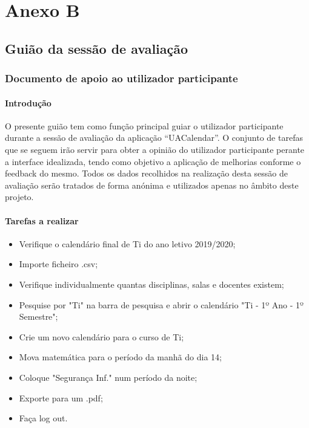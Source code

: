 \documentclass[11pt, twoside]{report}
\begin{document}
	
	\chapter*{Anexo B}
	\section*{Guião da sessão de avaliação}
	\subsection*{Documento de apoio ao utilizador participante}
	
	
	\subsubsection*{Introdução}
	O presente guião tem como função principal guiar o utilizador participante durante a sessão de avaliação da aplicação “UACalendar”. O conjunto de tarefas que se seguem irão servir para obter a opinião do utilizador participante perante a interface idealizada, tendo como objetivo a aplicação de melhorias conforme o feedback do mesmo.
	Todos os dados recolhidos na realização desta sessão de avaliação serão tratados de forma anónima e utilizados apenas no âmbito deste projeto.
	
	\subsubsection*{Tarefas a realizar}	
	\begin{itemize}
		\item Verifique o calendário final de Ti do ano letivo 2019/2020;
		\item Importe ficheiro .csv;
		\item Verifique individualmente quantas disciplinas, salas e docentes existem;
		\item Pesquise por "Ti" na barra de pesquisa e abrir o calendário "Ti - 1º Ano - 1º Semestre";
		\item Crie um novo calendário para o curso de Ti;
		\item Mova matemática para o período da manhã do dia 14;
		\item Coloque "Segurança Inf." num período da noite;
		\item Exporte para um .pdf;
		\item Faça log out.
	\end{itemize}
	

	
\end{document}
